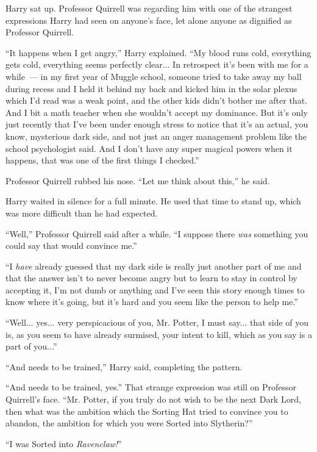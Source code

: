 Harry sat up. Professor Quirrell was regarding him with one of the strangest expressions Harry had seen on anyone's face, let alone anyone as dignified as Professor Quirrell.

``It happens when I get angry,'' Harry explained. ``My blood runs cold, everything gets cold, everything seems perfectly clear... In retrospect it's been with me for a while~--- in my first year of Muggle school, someone tried to take away my ball during recess and I held it behind my back and kicked him in the solar plexus which I'd read was a weak point, and the other kids didn't bother me after that. And I bit a math teacher when she wouldn't accept my dominance. But it's only just recently that I've been under enough stress to notice that it's an actual, you know, mysterious dark side, and not just an anger management problem like the school psychologist said. And I don't have any super magical powers when it happens, that was one of the first things I checked.''

Professor Quirrell rubbed his nose. ``Let me think about this,'' he said.

Harry waited in silence for a full minute. He used that time to stand up, which was more difficult than he had expected.

``Well,'' Professor Quirrell said after a while. ``I suppose there \emph{was} something you could say that would convince me.''

``I \emph{have} already guessed that my dark side is really just another part of me and that the answer isn't to never become angry but to learn to stay in control by accepting it, I'm not dumb or anything and I've seen this story enough times to know where it's going, but it's hard and you seem like the person to help me.''

``Well... yes... very perspicacious of you, Mr. Potter, I must say... that side of you is, as you seem to have already surmised, your intent to kill, which as you say is a part of you...''

``And needs to be trained,'' Harry said, completing the pattern.

``And needs to be trained, yes.'' That strange expression was still on Professor Quirrell's face. ``Mr. Potter, if you truly do not wish to be the next Dark Lord, then what was the ambition which the Sorting Hat tried to convince you to abandon, the ambition for which you were Sorted into Slytherin?''

``I was Sorted into \emph{Ravenclaw!}''

